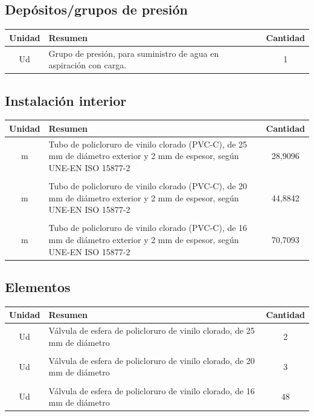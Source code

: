 \documentclass[../main.tex]{subfiles}
\begin{document}
\subsection{Depósitos/grupos de presión}
\begin{table}[H]
    \centering
    \begin{tabular}{c p{11.5cm} c}
        Unidad & Resumen & Cantidad  \\ \hline
        Ud & Grupo de presión, para suministro de agua en aspiración con carga. & 1
    \end{tabular}
\end{table}

\subsection{Instalación interior}
\begin{table}[H]
    \centering
    \begin{tabular}{c p{11.5cm} c}
        Unidad & Resumen & Cantidad  \\ \hline
        m & Tubo de policloruro de vinilo clorado (PVC-C), de 25 mm de diámetro exterior y 2 mm de espesor, según UNE-EN ISO 15877-2 & 28,9096 \\
        \\
        m & Tubo de policloruro de vinilo clorado (PVC-C), de 20 mm de diámetro exterior y 2 mm de espesor, según UNE-EN ISO 15877-2 & 44,8842 \\
        \\
        m & Tubo de policloruro de vinilo clorado (PVC-C), de 16 mm de diámetro exterior y 2 mm de espesor, según UNE-EN ISO 15877-2 & 70,7093 \\
    \end{tabular}
\end{table}

\subsection{Elementos}
\begin{table}[H]
    \centering
    \begin{tabular}{c p{11.5cm} c}
        Unidad & Resumen & Cantidad  \\ \hline
        Ud & Válvula de esfera de policloruro de vinilo clorado, de 25 mm de diámetro & 2 \\
        \\
        Ud & Válvula de esfera de policloruro de vinilo clorado, de 20 mm de diámetro & 3 \\
        \\
        Ud & Válvula de esfera de policloruro de vinilo clorado, de 16 mm de diámetro & 48 \\
    \end{tabular}
\end{table}
\end{document}

